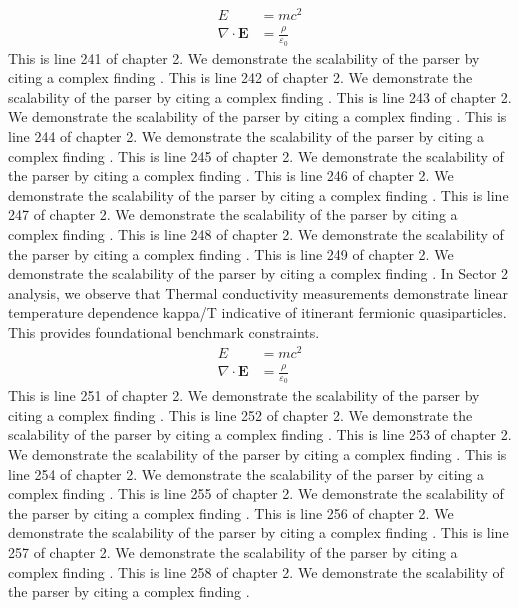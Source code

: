 \begin{align*}
  E &= mc^2 \\
  \nabla \cdot \mathbf{E} &= \frac{\rho}{\varepsilon_0}
\end{align*}
This is line 241 of chapter 2. We demonstrate the scalability of the parser by citing a complex finding \cite{ref2_241}.
This is line 242 of chapter 2. We demonstrate the scalability of the parser by citing a complex finding \cite{ref2_242}.
This is line 243 of chapter 2. We demonstrate the scalability of the parser by citing a complex finding \cite{ref2_243}.
This is line 244 of chapter 2. We demonstrate the scalability of the parser by citing a complex finding \cite{ref2_244}.
This is line 245 of chapter 2. We demonstrate the scalability of the parser by citing a complex finding \cite{ref2_245}.
This is line 246 of chapter 2. We demonstrate the scalability of the parser by citing a complex finding \cite{ref2_246}.
This is line 247 of chapter 2. We demonstrate the scalability of the parser by citing a complex finding \cite{ref2_247}.
This is line 248 of chapter 2. We demonstrate the scalability of the parser by citing a complex finding \cite{ref2_248}.
This is line 249 of chapter 2. We demonstrate the scalability of the parser by citing a complex finding \cite{ref2_249}.
In Sector 2 analysis, we observe that Thermal conductivity measurements demonstrate linear temperature dependence kappa/T indicative of itinerant fermionic quasiparticles. This provides foundational benchmark constraints.
\begin{align*}
  E &= mc^2 \\
  \nabla \cdot \mathbf{E} &= \frac{\rho}{\varepsilon_0}
\end{align*}
This is line 251 of chapter 2. We demonstrate the scalability of the parser by citing a complex finding \cite{ref2_251}.
This is line 252 of chapter 2. We demonstrate the scalability of the parser by citing a complex finding \cite{ref2_252}.
This is line 253 of chapter 2. We demonstrate the scalability of the parser by citing a complex finding \cite{ref2_253}.
This is line 254 of chapter 2. We demonstrate the scalability of the parser by citing a complex finding \cite{ref2_254}.
This is line 255 of chapter 2. We demonstrate the scalability of the parser by citing a complex finding \cite{ref2_255}.
This is line 256 of chapter 2. We demonstrate the scalability of the parser by citing a complex finding \cite{ref2_256}.
This is line 257 of chapter 2. We demonstrate the scalability of the parser by citing a complex finding \cite{ref2_257}.
This is line 258 of chapter 2. We demonstrate the scalability of the parser by citing a complex finding \cite{ref2_258}.
